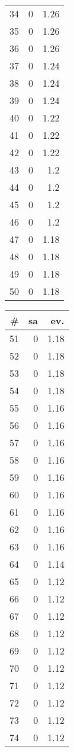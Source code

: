 \begin{appendices}
\begin{table}[h]
\begin{minipage}[t]{0.24\linewidth}
\begin{tabular}{|r|r|r|}
34 & 0 & 1.26\\
35 & 0 & 1.26\\
36 & 0 & 1.26\\
37 & 0 & 1.24\\
38 & 0 & 1.24\\
39 & 0 & 1.24\\
40 & 0 & 1.22\\
41 & 0 & 1.22\\
42 & 0 & 1.22\\
43 & 0 & 1.2\\
44 & 0 & 1.2\\
45 & 0 & 1.2\\
46 & 0 & 1.2\\
47 & 0 & 1.18\\
48 & 0 & 1.18\\
49 & 0 & 1.18\\
50 & 0 & 1.18\\
\hline
\end{tabular}
\end{minipage}
\begin{minipage}[t]{0.24\linewidth}
\begin{tabular}{|r|r|r|}
\hline
\# & sa & ev.\\
\hline
\hline
51 & 0 & 1.18\\
52 & 0 & 1.18\\
53 & 0 & 1.18\\
54 & 0 & 1.18\\
55 & 0 & 1.16\\
56 & 0 & 1.16\\
57 & 0 & 1.16\\
58 & 0 & 1.16\\
59 & 0 & 1.16\\
60 & 0 & 1.16\\
61 & 0 & 1.16\\
62 & 0 & 1.16\\
63 & 0 & 1.16\\
64 & 0 & 1.14\\
65 & 0 & 1.12\\
66 & 0 & 1.12\\
67 & 0 & 1.12\\
68 & 0 & 1.12\\
69 & 0 & 1.12\\
70 & 0 & 1.12\\
71 & 0 & 1.12\\
72 & 0 & 1.12\\
73 & 0 & 1.12\\
74 & 0 & 1.12\\

\end{tabular}
\end{minipage}
\end{table}
\end{appendices}
